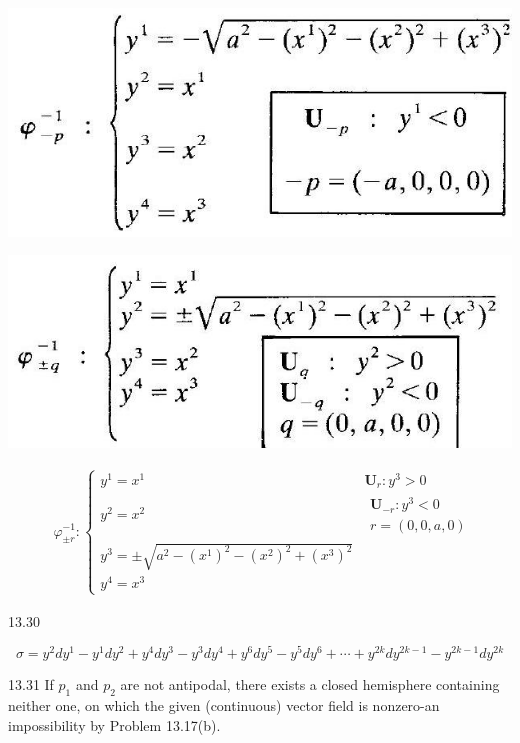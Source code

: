 \documentclass[10pt]{article}
\begin{document}
\begin{center}
\includegraphics[max width=\textwidth]{2024_04_03_41f90be4f896e21f0dc9g-231}
\end{center}

\begin{center}
\includegraphics[max width=\textwidth]{2024_04_03_41f90be4f896e21f0dc9g-231(2)}
\end{center}

$$
\begin{aligned}
& \varphi_{ \pm r}^{-1}:\left\{\begin{array}{l|l}
y^{1}=x^{1} & \mathbf{U}_{r}: y^{3}>0 \\
y^{2}=x^{2} & \begin{array}{c}
\mathbf{U}_{-r}: y^{3}<0 \\
r=(0,0, a, 0)
\end{array} \\
y^{3}= \pm \sqrt{a^{2}-\left(x^{1}\right)^{2}-\left(x^{2}\right)^{2}+\left(x^{3}\right)^{2}} \\
y^{4}=x^{3}
\end{array}\right.
\end{aligned}
$$

13.30

$$
\sigma=y^{2} d y^{1}-y^{1} d y^{2}+y^{4} d y^{3}-y^{3} d y^{4}+y^{6} d y^{5}-y^{5} d y^{6}+\cdots+y^{2 k} d y^{2 k-1}-y^{2 k-1} d y^{2 k}
$$

13.31 If $p_{1}$ and $p_{2}$ are not antipodal, there exists a closed hemisphere containing neither one, on which the given (continuous) vector field is nonzero-an impossibility by Problem 13.17(b).
\end{document}
